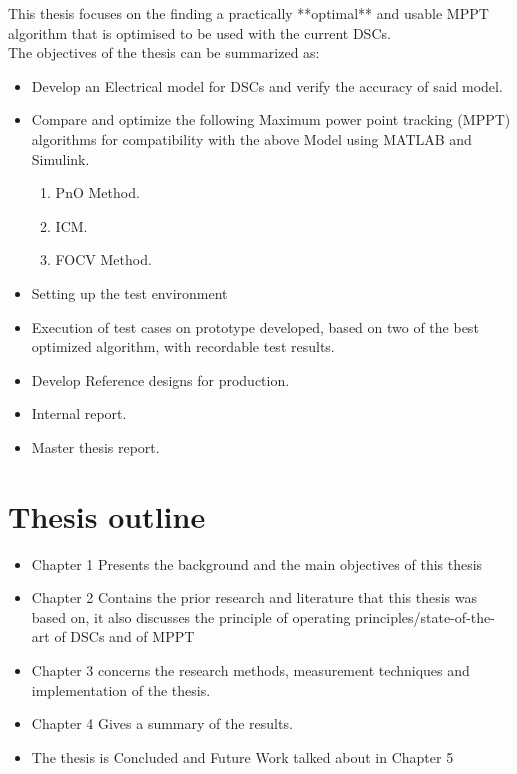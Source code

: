 This thesis focuses on the finding a practically **optimal** and usable \ac{MPPT} algorithm that is optimised to be used with the current \ac{DSCs}.\\


The objectives of the thesis can be summarized as:
\begin{itemize}

\item Develop an Electrical model for DSCs and verify the accuracy of said model.
 
\item Compare and optimize the following Maximum power point tracking (MPPT) algorithms for compatibility with the above Model using MATLAB{\textregistered} and Simulink{\textregistered}.
	\begin{enumerate}
		\item \ac{PnO} Method.
		\item \ac{ICM}.
		\item \ac{FOCV} Method.
		
	\end{enumerate}
\item Setting up the test environment   
\item Execution of test cases on prototype developed, based on two of the best optimized algorithm, with recordable test results.
\item Develop Reference designs for production.
\item Internal report.
\item  Master thesis report. 
\end {itemize}

\section{Thesis outline}
\begin{itemize}
\item Chapter 1 Presents the background and the main objectives of this thesis \\
\item Chapter 2 Contains the prior research and literature that this thesis was based on, it also discusses the principle of operating principles/state-of-the-art  of \ac{DSCs} and of \ac{MPPT} \\
\item Chapter 3 concerns the  research methods, measurement techniques and implementation of the thesis.
\item Chapter 4 Gives a summary of the results. 
\item The thesis is Concluded and Future Work talked about in Chapter 5
\end {itemize}

